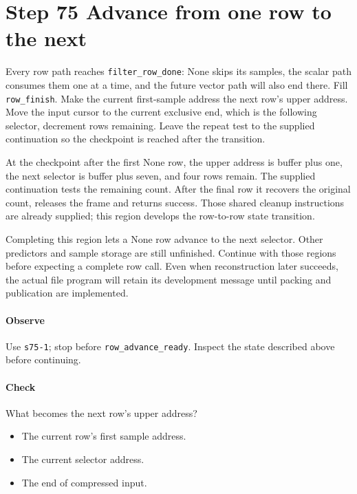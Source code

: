 \section{Step 75 Advance from one row to the next}
Every row path reaches \texttt{filter\_row\_done}: None skips its samples, the scalar path consumes them one at a time, and the future vector path will also end there. Fill \texttt{row\_finish}. Make the current first-sample address the next row’s upper address. Move the input cursor to the current exclusive end, which is the following selector, decrement rows remaining. Leave the repeat test to the supplied continuation so the checkpoint is reached after the transition.

At the checkpoint after the first None row, the upper address is buffer plus one, the next selector is buffer plus seven, and four rows remain. The supplied continuation tests the remaining count. After the final row it recovers the original count, releases the frame and returns success. Those shared cleanup instructions are already supplied; this region develops the row-to-row state transition.

Completing this region lets a None row advance to the next selector. Other predictors and sample storage are still unfinished. Continue with those regions before expecting a complete row call. Even when reconstruction later succeeds, the actual file program will retain its development message until packing and publication are implemented.

\paragraph{Observe} Use \texttt{s75-1}; stop before \texttt{row\_advance\_ready}. Inspect the state described above before continuing.

\paragraph{Check} What becomes the next row’s upper address?
\begin{itemize}
  \item[A.] The current row’s first sample address.
  \item[B.] The current selector address.
  \item[C.] The end of compressed input.
\end{itemize}
